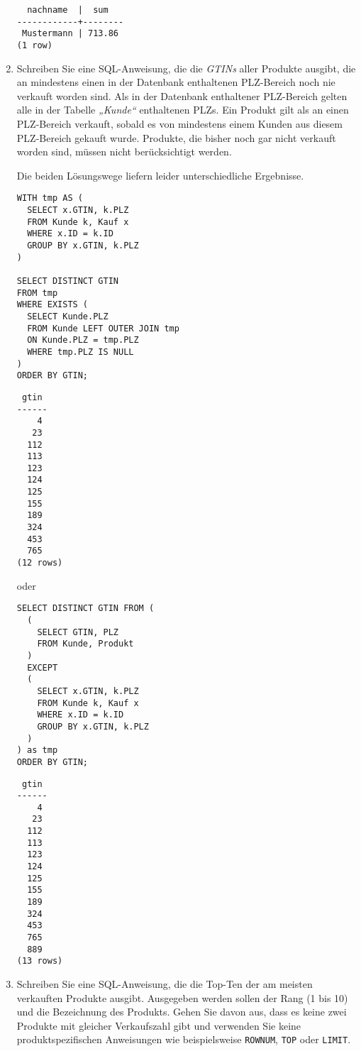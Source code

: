 \documentclass{bschlangaul-aufgabe}
\begin{document}
\begin{enumerate}
\begin{bAntwort}
\begin{verbatim}
  nachname  |  sum
------------+--------
 Mustermann | 713.86
(1 row)
\end{verbatim}
\end{bAntwort}


\item Schreiben Sie eine SQL-Anweisung, die die \emph{GTINs} aller
Produkte ausgibt, die an mindestens einen in der Datenbank enthaltenen
PLZ-Bereich noch nie verkauft worden sind. Als in der Datenbank
enthaltener PLZ-Bereich gelten alle in der Tabelle \emph{„Kunde“}
enthaltenen PLZs. Ein Produkt gilt als an einen PLZ-Bereich verkauft,
sobald es von mindestens einem Kunden aus diesem PLZ-Bereich gekauft
wurde. Produkte, die bisher noch gar nicht verkauft worden sind, müssen
nicht berücksichtigt werden.

\begin{bAntwort}
Die beiden Lösungswege liefern leider unterschiedliche Ergebnisse.
\begin{verbatim}
WITH tmp AS (
  SELECT x.GTIN, k.PLZ
  FROM Kunde k, Kauf x
  WHERE x.ID = k.ID
  GROUP BY x.GTIN, k.PLZ
)

SELECT DISTINCT GTIN
FROM tmp
WHERE EXISTS (
  SELECT Kunde.PLZ
  FROM Kunde LEFT OUTER JOIN tmp
  ON Kunde.PLZ = tmp.PLZ
  WHERE tmp.PLZ IS NULL
)
ORDER BY GTIN;
\end{verbatim}

\begin{verbatim}
 gtin
------
    4
   23
  112
  113
  123
  124
  125
  155
  189
  324
  453
  765
(12 rows)
\end{verbatim}

oder

\begin{verbatim}
SELECT DISTINCT GTIN FROM (
  (
    SELECT GTIN, PLZ
    FROM Kunde, Produkt
  )
  EXCEPT
  (
    SELECT x.GTIN, k.PLZ
    FROM Kunde k, Kauf x
    WHERE x.ID = k.ID
    GROUP BY x.GTIN, k.PLZ
  )
) as tmp
ORDER BY GTIN;
\end{verbatim}

\begin{verbatim}
 gtin
------
    4
   23
  112
  113
  123
  124
  125
  155
  189
  324
  453
  765
  889
(13 rows)
\end{verbatim}
\end{bAntwort}


\item Schreiben Sie eine SQL-Anweisung, die die Top-Ten der am meisten
verkauften Produkte ausgibt. Ausgegeben werden sollen der Rang (1 bis
10) und die Bezeichnung des Produkts. Gehen Sie davon aus, dass es keine
zwei Produkte mit gleicher Verkaufszahl gibt und verwenden Sie keine
produktspezifischen Anweisungen wie beispielsweise \verb|ROWNUM|,
\verb|TOP| oder \verb|LIMIT|.


\end{enumerate}
\end{document}
